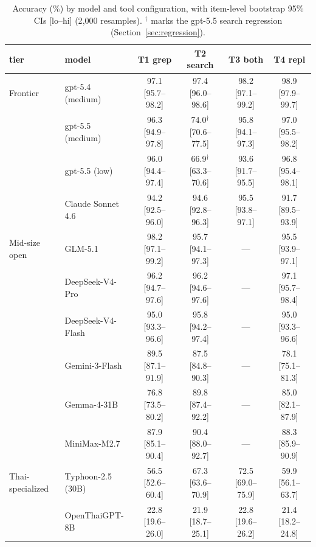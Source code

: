 \documentclass[11pt]{article}
\begin{document}
\begin{table}[t]
\centering
\footnotesize
\begin{tabular}{@{}llcccc@{}}
\toprule
\textbf{tier} & \textbf{model} & \textbf{T1 grep} & \textbf{T2 search} & \textbf{T3 both} & \textbf{T4 repl} \\
\midrule
Frontier & gpt-5.4 (medium) & 97.1 [95.7--98.2] & 97.4 [96.0--98.6] & 98.2 [97.1--99.2] & 98.9 [97.9--99.7] \\
 & gpt-5.5 (medium) & 96.3 [94.9--97.8] & 74.0$^{\dagger}$ [70.6--77.5] & 95.8 [94.1--97.3] & 97.0 [95.5--98.2] \\
 & gpt-5.5 (low) & 96.0 [94.4--97.4] & 66.9$^{\dagger}$ [63.3--70.6] & 93.6 [91.7--95.5] & 96.8 [95.4--98.1] \\
 & Claude Sonnet 4.6 & 94.2 [92.5--96.0] & 94.6 [92.8--96.3] & 95.5 [93.8--97.1] & 91.7 [89.5--93.9] \\
Mid-size open & GLM-5.1 & 98.2 [97.1--99.2] & 95.7 [94.1--97.3] & --- & 95.5 [93.9--97.1] \\
 & DeepSeek-V4-Pro & 96.2 [94.7--97.6] & 96.2 [94.6--97.6] & --- & 97.1 [95.7--98.4] \\
 & DeepSeek-V4-Flash & 95.0 [93.3--96.6] & 95.8 [94.2--97.4] & --- & 95.0 [93.3--96.6] \\
 & Gemini-3-Flash & 89.5 [87.1--91.9] & 87.5 [84.8--90.3] & --- & 78.1 [75.1--81.3] \\
 & Gemma-4-31B & 76.8 [73.5--80.2] & 89.8 [87.4--92.2] & --- & 85.0 [82.1--87.9] \\
 & MiniMax-M2.7 & 87.9 [85.1--90.4] & 90.4 [88.0--92.7] & --- & 88.3 [85.9--90.9] \\
Thai-specialized & Typhoon-2.5 (30B) & 56.5 [52.6--60.4] & 67.3 [63.6--70.9] & 72.5 [69.0--75.9] & 59.9 [56.1--63.7] \\
 & OpenThaiGPT-8B & 22.8 [19.6--26.0] & 21.9 [18.7--25.1] & 22.8 [19.6--26.2] & 21.4 [18.2--24.8] \\
\bottomrule
\end{tabular}
\caption{Accuracy (\%) by model and tool configuration, with item-level bootstrap 95\% CIs [lo--hi]
(2{,}000 resamples). $^{\dagger}$ marks the gpt-5.5 search regression (Section~\ref{sec:regression}).}
\label{tab:leaderboard}
\end{table}
\end{document}
